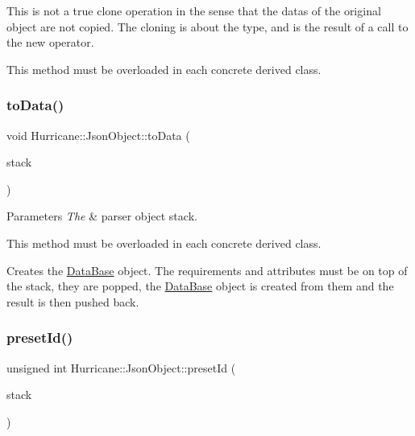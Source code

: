 This is not a true clone operation in the sense that the datas of the original object are not copied. The cloning is about the type, and is the result of a call to the {\ttfamily new} operator.

This method must be overloaded in each concrete derived class. \mbox{\label{classHurricane_1_1JsonObject_a57a845ca64ac8912b35c4dbf75723af6}} 
\subsubsection{\texorpdfstring{to\+Data()}{toData()}}
{\footnotesize\ttfamily void Hurricane\+::\+Json\+Object\+::to\+Data (\begin{DoxyParamCaption}\item[{\hyperlink{classHurricane_1_1JsonStack}{Json\+Stack} \&}]{stack }\end{DoxyParamCaption})\hspace{0.3cm}{\ttfamily [virtual]}}


\begin{DoxyParams}{Parameters}
{\em The} & parser object stack.\\
\hline
\end{DoxyParams}
This method must be overloaded in each concrete derived class.

Creates the \hyperlink{classHurricane_1_1DataBase}{Data\+Base} object. The requirements and attributes must be on top of the stack, they are popped, the \hyperlink{classHurricane_1_1DataBase}{Data\+Base} object is created from them and the result is then pushed back. \mbox{\label{classHurricane_1_1JsonObject_a3819d0c96ee99277e4cc8d349dc4155c}} 
\subsubsection{\texorpdfstring{preset\+Id()}{presetId()}}
{\footnotesize\ttfamily unsigned int Hurricane\+::\+Json\+Object\+::preset\+Id (\begin{DoxyParamCaption}\item[{\hyperlink{classHurricane_1_1JsonStack}{Json\+Stack} \&}]{stack }\end{DoxyParamCaption})}


